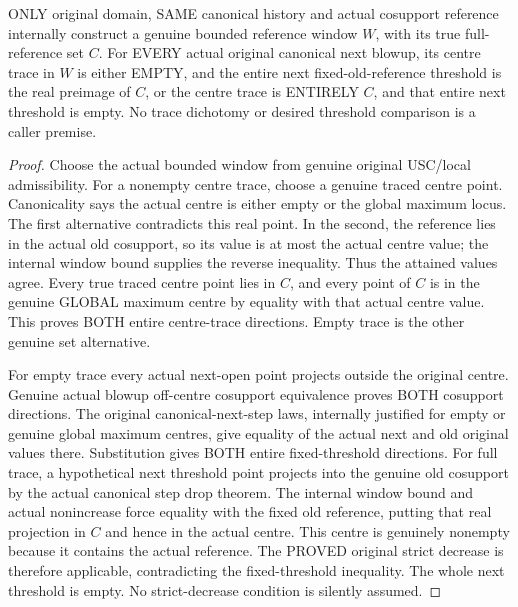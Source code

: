 \begin{theorem}
\label{hir:original-canonical-next-full-reference-centre-and-threshold-dichotomy}
\leanok
{}
ONLY original domain, SAME canonical history and actual cosupport reference
internally construct a genuine bounded reference window $W$, with its true
full-reference set $C$. For EVERY actual original canonical next blowup,
its centre trace in $W$ is either EMPTY, and the entire next fixed-old-reference
threshold is the real preimage of $C$, or the centre trace is ENTIRELY $C$,
and that entire next threshold is empty. No trace dichotomy or desired
threshold comparison is a caller premise.
\end{theorem}
\begin{proof}
Choose the actual bounded window from genuine original USC/local admissibility.
For a nonempty centre trace, choose a genuine traced centre point. Canonicality
says the actual centre is either empty or the global maximum locus. The first
alternative contradicts this real point. In the second, the reference lies in
the actual old cosupport, so its value is at most the actual centre value;
the internal window bound supplies the reverse inequality. Thus the attained
values agree. Every true traced centre point lies in $C$, and every point of
$C$ is in the genuine GLOBAL maximum centre by equality with that actual
centre value. This proves BOTH entire centre-trace directions. Empty trace is
the other genuine set alternative.

For empty trace every actual next-open point projects outside the original
centre. Genuine actual blowup off-centre cosupport equivalence proves BOTH
cosupport directions. The original canonical-next-step laws, internally
justified for empty or genuine global maximum centres, give equality of the
actual next and old original values there. Substitution gives BOTH entire
fixed-threshold directions. For full trace, a hypothetical next threshold
point projects into the genuine old cosupport by the actual canonical step
drop theorem. The internal window bound and actual nonincrease force equality
with the fixed old reference, putting that real projection in $C$ and hence
in the actual centre. This centre is genuinely nonempty because it contains
the actual reference. The PROVED original strict decrease is therefore
applicable, contradicting the fixed-threshold inequality. The whole next
threshold is empty. No strict-decrease condition is silently assumed.
\end{proof}

